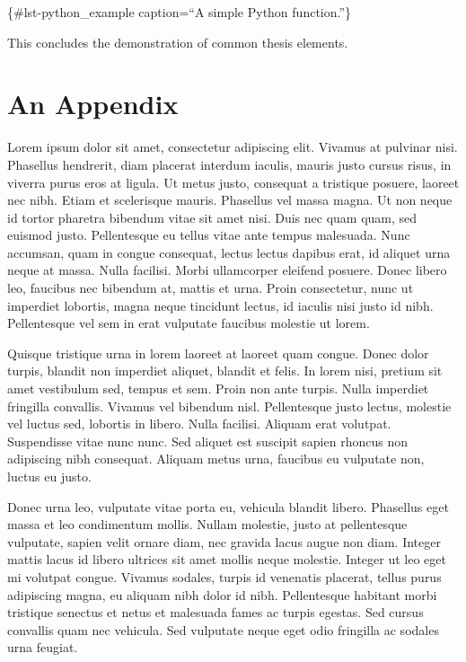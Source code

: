 \documentclass{article}
\begin{document}
\{\#lst-python\_example caption=``A simple Python function.''\}

This concludes the demonstration of common thesis elements.

\cleardoublepage
{}
{}
\appendix

\chapter{An Appendix}\label{an-appendix}

Lorem ipsum dolor sit amet, consectetur adipiscing elit. Vivamus at
pulvinar nisi. Phasellus hendrerit, diam placerat interdum iaculis,
mauris justo cursus risus, in viverra purus eros at ligula. Ut metus
justo, consequat a tristique posuere, laoreet nec nibh. Etiam et
scelerisque mauris. Phasellus vel massa magna. Ut non neque id tortor
pharetra bibendum vitae sit amet nisi. Duis nec quam quam, sed euismod
justo. Pellentesque eu tellus vitae ante tempus malesuada. Nunc
accumsan, quam in congue consequat, lectus lectus dapibus erat, id
aliquet urna neque at massa. Nulla facilisi. Morbi ullamcorper eleifend
posuere. Donec libero leo, faucibus nec bibendum at, mattis et urna.
Proin consectetur, nunc ut imperdiet lobortis, magna neque tincidunt
lectus, id iaculis nisi justo id nibh. Pellentesque vel sem in erat
vulputate faucibus molestie ut lorem.

Quisque tristique urna in lorem laoreet at laoreet quam congue. Donec
dolor turpis, blandit non imperdiet aliquet, blandit et felis. In lorem
nisi, pretium sit amet vestibulum sed, tempus et sem. Proin non ante
turpis. Nulla imperdiet fringilla convallis. Vivamus vel bibendum nisl.
Pellentesque justo lectus, molestie vel luctus sed, lobortis in libero.
Nulla facilisi. Aliquam erat volutpat. Suspendisse vitae nunc nunc. Sed
aliquet est suscipit sapien rhoncus non adipiscing nibh consequat.
Aliquam metus urna, faucibus eu vulputate non, luctus eu justo.

Donec urna leo, vulputate vitae porta eu, vehicula blandit libero.
Phasellus eget massa et leo condimentum mollis. Nullam molestie, justo
at pellentesque vulputate, sapien velit ornare diam, nec gravida lacus
augue non diam. Integer mattis lacus id libero ultrices sit amet mollis
neque molestie. Integer ut leo eget mi volutpat congue. Vivamus sodales,
turpis id venenatis placerat, tellus purus adipiscing magna, eu aliquam
nibh dolor id nibh. Pellentesque habitant morbi tristique senectus et
netus et malesuada fames ac turpis egestas. Sed cursus convallis quam
nec vehicula. Sed vulputate neque eget odio fringilla ac sodales urna
feugiat.
\end{document}
